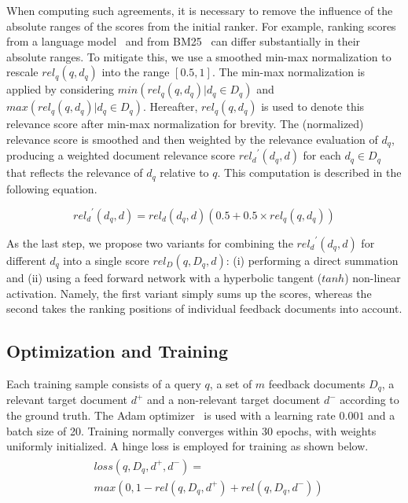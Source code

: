 \documentclass[11pt,a4paper]{article}
\begin{document}
When computing such agreements, it is necessary to remove the influence of the absolute ranges of the scores from the initial ranker.
For example, ranking scores from a language model~\cite{DBLP:conf/sigir/PonteC98} and from BM25~\cite{DBLP:conf/trec/RobertsonWHGP95} can differ substantially in their absolute ranges.
To mitigate this, we use a smoothed min-max normalization to rescale 
$\mathit{rel}_{q}(q, d_q)$ into the range $[0.5,1]$.
The min-max normalization is applied by considering
$\mathit{min}(\mathit{rel}_{q}(q, d_q)|d_q\in D_q)$ and 
$\mathit{max}(\mathit{rel}_{q}(q, d_q)|d_q\in D_q)$.
Hereafter, 
 $\mathit{rel}_{q}(q, d_q)$ is used to denote this
relevance score after min-max normalization for brevity.
The (normalized) relevance score is smoothed and then weighted by the relevance evaluation of $d_q$,
producing a weighted document relevance score $\mathit{rel_d}^\prime(d_q, d)$ for each $d_q\in D_q$
that reflects the relevance of $d_q$ relative to $q$.
This computation is described in the following equation.

\begin{equation}\label{eq.gating}
\mathit{rel_d}^\prime(d_q, d)=\mathit{rel_d}(d_q, d)(0.5+0.5\times \mathit{rel}_{q}(q, d_q))
\end{equation}

As the last step, we propose two variants
for combining the $\mathit{rel_d}^\prime(d_q, d)$ for different $d_q$ into a single score $\mathit{rel_D}(q, D_q, d)$:
(i) performing a direct summation and (ii) using a feed forward network with a hyperbolic tangent ($\mathit{tanh}$)
non-linear activation.
Namely,
the first variant simply sums up the scores, whereas the second
takes the ranking positions of individual feedback documents into account. 

\vspace{\vignore}
\subsection{Optimization and Training}
\vspace{\vignore}
Each training sample consists of a query $q$, a set of $m$ feedback documents $D_q$, 
a relevant target document $d^+$ and a non-relevant target document $d^-$
according to the ground truth.
The Adam optimizer~\cite{adam} is used with a learning rate $0.001$ and a batch size of 20. Training normally converges within 30 epochs, with weights uniformly initialized.
A hinge loss is employed for training 
as shown below.
\begin{align}\label{eq.loss}
\begin{split}
&\mathit{loss}(q, D_q, d^+, d^-) =  \\
&max(0, 1 - \mathit{rel}(q, D_q, d^+)+\mathit{rel}(q, D_q, d^-)) \nonumber
\end{split}
\end{align}
\end{document}
